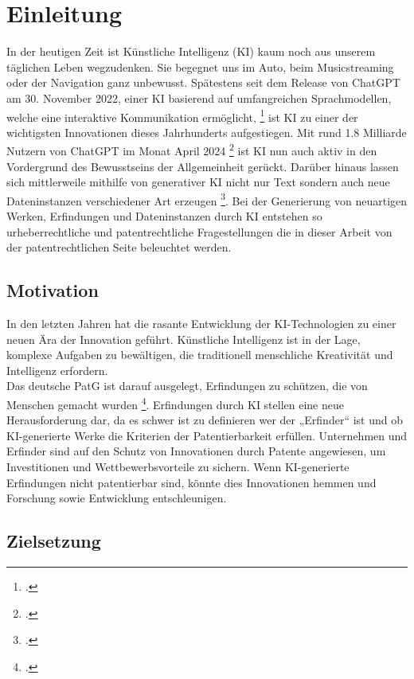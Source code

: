 \chapter{Einleitung \label{cha:chapter1}}

In der heutigen Zeit ist Künstliche Intelligenz (\gls{KI}) kaum 
noch aus unserem täglichen Leben wegzudenken. 
Sie begegnet uns im Auto, beim Musicstreaming oder der Navigation ganz unbewusst. 
Spätestens seit dem Release von ChatGPT am 30. November 2022, 
einer KI basierend auf umfangreichen Sprachmodellen, 
welche eine interaktive Kommunikation ermöglicht, 
\footcite{ChatGPT} ist KI zu einer 
der wichtigsten Innovationen dieses Jahrhunderts aufgestiegen. 
Mit rund 1.8 Milliarde Nutzern von ChatGPT im Monat April 2024 
\footcite{NumberChatGPTUsers2023} 
ist KI nun auch aktiv in den Vordergrund des Bewusstseins 
der Allgemeinheit gerückt. 
Darüber hinaus lassen sich mittlerweile mithilfe von generativer KI 
nicht nur Text sondern auch neue 
Dateninstanzen verschiedener Art erzeugen \footcite{WasIstKuenstliche}. 
Bei der Generierung von neuartigen Werken, 
Erfindungen und Dateninstanzen durch KI entstehen so 
urheberrechtliche und 
patentrechtliche Fragestellungen die in dieser Arbeit von der 
patentrechtlichen Seite beleuchtet werden.


\section{Motivation\label{sec:moti}}

In den letzten Jahren hat die rasante Entwicklung 
der KI-Technologien zu einer neuen Ära der Innovation geführt. 
Künstliche Intelligenz ist in der Lage, komplexe Aufgaben zu bewältigen, 
die traditionell menschliche Kreativität und Intelligenz erfordern. 
\\

Das deutsche \gls{PatG} ist darauf ausgelegt, 
Erfindungen zu schützen, die von Menschen gemacht wurden
\footcite{DPMAPatentschutz}. 
Erfindungen durch KI stellen eine neue Herausforderung dar, 
da es schwer ist zu definieren wer der „Erfinder“ ist und ob 
KI-generierte Werke die Kriterien der Patentierbarkeit erfüllen. 
Unternehmen und Erfinder sind auf den Schutz von Innovationen durch 
Patente angewiesen, um Investitionen und Wettbewerbsvorteile zu sichern. 
Wenn KI-generierte Erfindungen nicht patentierbar sind, 
könnte dies Innovationen hemmen 
und Forschung sowie Entwicklung entschleunigen. 

\section{Zielsetzung\label{sec:objective}}

